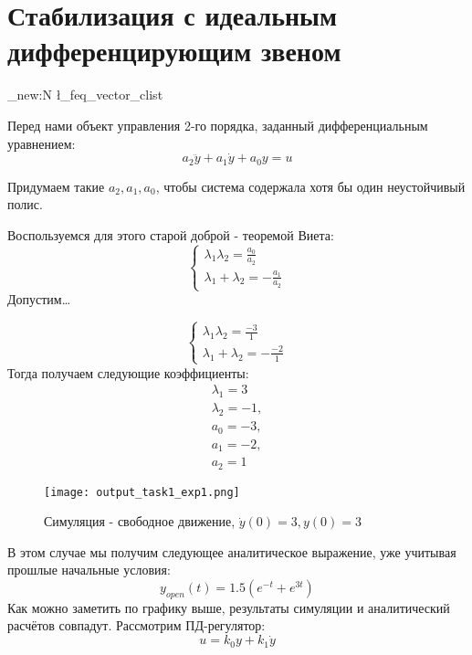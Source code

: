 \chapter{Стабилизация с идеальным дифференцирующим звеном}
\label{ch:chap1}
\newcommand\tab[1][1cm]{\hspace*{#1}}

\ExplSyntaxOn
\clist_new:N \l_feq_vector_clist
\ExplSyntaxOff


Перед нами объект управления 2-го порядка, заданный дифференциальным уравнением:
$$
a_2\ddot{y} + a_1\dot{y} + a_0y = u
$$

Придумаем такие $a_2,a_1,a_0$, чтобы система содержала хотя бы один неустойчивый полис.

Воспользуемся для этого старой доброй - теоремой Виета:
$$
\begin{cases}
  \lambda_1\lambda_2 = \frac{a_0}{a_2} \\
  \lambda_1 + \lambda_2 = - \frac{a_1}{a_2} 
\end{cases}
$$
Допустим\dots

$$
\begin{cases}
  \lambda_1\lambda_2 = \frac{-3}{1} \\
  \lambda_1 + \lambda_2 = - \frac{-2}{1} 
\end{cases}
$$
Тогда получаем следующие коэффициенты:
$$
\begin{aligned}
  \lambda_1 = 3 \\
  \lambda_2 = -1, \\
  a_0 = -3, \\
  a_1 = -2, \\
  a_2 = 1
\end{aligned}
$$

\begin{figure}[ht]
  \centering
  \texttt{[image: output\_task1\_exp1.png]}
\caption{Симуляция - свободное движение, $\dot{y}(0)=3, y(0) = 3$}
\end{figure}


\newpage
В этом случае мы получим следующее аналитическое выражение, уже учитывая прошлые начальные условия:
$$
y_{open}(t) = 1.5(e^{-t} + e^{3t})
$$
Как можно заметить по графику выше, результаты симуляции и аналитический расчётов совпадут.
\newpage
Рассмотрим ПД-регулятор:
$$
u = k_0y + k_1\dot{y}
$$

